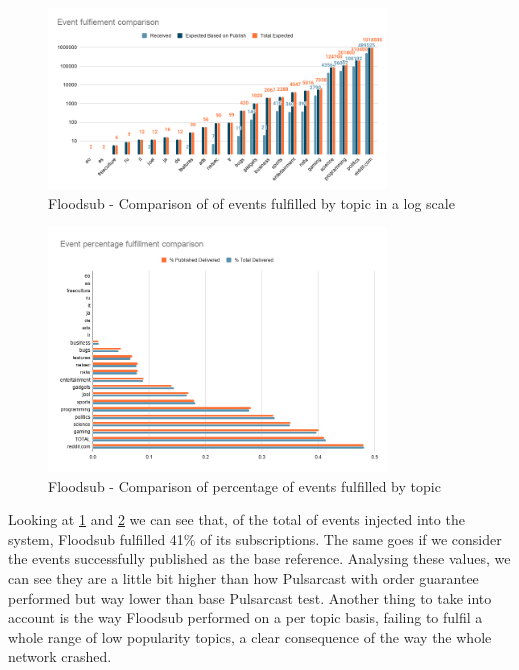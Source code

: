 \begin{figure}[!htb]
  \centering
  \includegraphics[width=0.8\textwidth]{img/graph-floodsub-event-fulfillment-comparison.png}
  \caption{Floodsub - Comparison of of events fulfilled by topic in a log scale}
  \label{fig:graph-floodsub-event-fulfillment-comparison}
\end{figure}

\begin{figure}[!htb]
  \centering
  \includegraphics[width=0.8\textwidth]{img/graph-floodsub-event-percentage-fulfillment-comparison.png}
  \caption{Floodsub - Comparison of percentage of events fulfilled by topic}
  \label{fig:graph-floodsub-event-percentage-fulfillment-comparison}
\end{figure}

Looking at \ref{fig:graph-floodsub-event-fulfillment-comparison} and
\ref{fig:graph-floodsub-event-percentage-fulfillment-comparison} we can see
that, of the total of events injected into the system, Floodsub fulfilled 41\%
of its subscriptions. The same goes if we consider the events successfully
published as the base reference. Analysing these values, we can see they are a
little bit higher than how Pulsarcast with order guarantee performed but way
lower than base Pulsarcast test. Another thing to take into account is the way
Floodsub performed on a per topic basis, failing to fulfil a  whole range of
low popularity topics, a clear consequence of the way the whole network
crashed.

